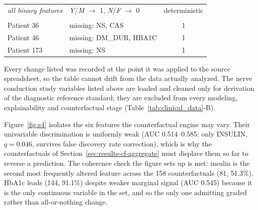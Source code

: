 \documentclass[pdflatex,sn-mathphys-num]{sn-jnl}%
\theoremstyle{thmstyleone}%
\theoremstyle{thmstyletwo}%
\theoremstyle{thmstylethree}%
\begin{document}
\begin{appendices}
\begin{table}[!tbp]
\begin{tabular}{llc}
        \textit{all binary features} & \textit{Y}/\textit{M} $\rightarrow$ 1, \textit{N}/\textit{F} $\rightarrow$ 0 & deterministic \\
        \addlinespace
        \multicolumn{3}{l}{\textit{Excluded records}} \\
        Patient 36 & missing: NS, CAS & 1 \\
        Patient 46 & missing: DM\_DUR, HBA1C & 1 \\
        Patient 173 & missing: NS & 1 \\
        \bottomrule
    \end{tabular}
    \begin{flushleft}\footnotesize Every change listed was recorded at the point it was applied to the source
        spreadsheet, so the table cannot drift from the data actually analyzed. The nerve conduction study
        variables listed above are loaded and cleaned only for derivation of the diagnostic
        reference standard; they are excluded from every modeling, explainability and
        counterfactual stage (Table~\ref{tab:clinical_data}-B).\end{flushleft}
\end{table}

Figure~\ref{fig:s4} isolates the six features the counterfactual engine may vary. Their
univariable discrimination is uniformly weak (AUC 0.514--0.585; only INSULIN, $q = 0.046$,
survives false discovery rate correction), which is why the counterfactuals of
Section~\ref{sec:results-cf-aggregate} must displace them so far to reverse a prediction. The
coherence check the figure sets up is met: insulin is the second most frequently altered feature
across the 158 counterfactuals (81, 51.3\%). HbA1c leads (144, 91.1\%) despite weaker marginal
signal (AUC 0.545) because it is the only continuous variable in the set, and so the only one
admitting graded rather than all-or-nothing change.


\end{appendices}
\end{document}
